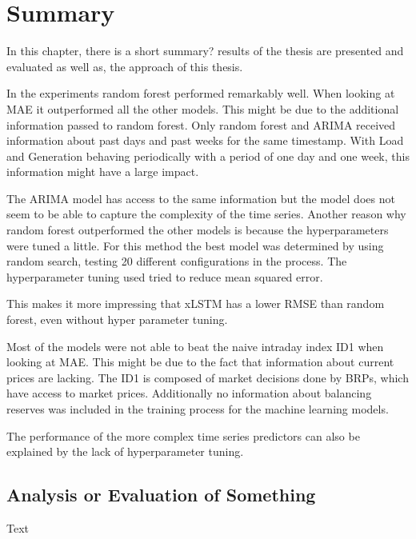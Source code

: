 \documentclass[class=scrbook, crop=false]{standalone}
\begin{document}
\chapter{Summary}
\label{Chapter::Summary}
    In this chapter, there is a short summary? results of the thesis are presented and evaluated as well as, the approach of this thesis.

In the experiments random forest performed remarkably well. 
When looking at MAE it outperformed all the other models. 
This might be due to the additional information passed to random forest. 
Only random forest and ARIMA received information about past days and past weeks for the same timestamp. 
With Load and Generation behaving periodically with a period of one day and one week, this information might have a large impact.

The ARIMA model has access to the same information but the model does not seem to be able to capture the complexity of the time series.
Another reason why random forest outperformed the other models is because the hyperparameters were tuned a little. 
For this method the best model was determined by using random search, testing 20 different configurations in the process.
The hyperparameter tuning used tried to reduce mean squared error.

This makes it more impressing that xLSTM has a lower RMSE than random forest, even without hyper parameter tuning.

Most of the models were not able to beat the naive intraday index ID1 when looking at MAE. 
This might be due to the fact that information about current prices are lacking. 
The ID1 is composed of market decisions done by BRPs, which have access to market prices.
Additionally no information about balancing reserves was included in the training process for the machine learning models.

The performance of the more complex time series predictors can also be explained by the lack of hyperparameter tuning. 


\section{Analysis or Evaluation of Something}
\label{Section::Short Analysis or Evaluation of Something}    
    Text
\end{document}
